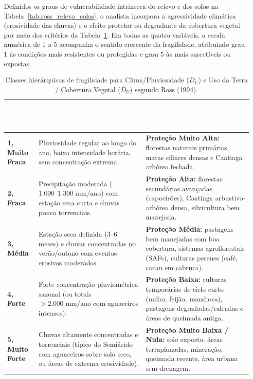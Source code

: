 Definidos os graus de vulnerabilidade intrínseca do relevo e dos solos na Tabela~\ref{tab:ross_relevo_solos}, o analista incorpora a agressividade climática (erosividade das chuvas) e o efeito protetor ou degradante da cobertura vegetal por meio dos critérios da Tabela~\ref{tab:ross_clima_uso}. Em todas as quatro variáveis, a escala numérica de $1$ a $5$ acompanha o sentido crescente da fragilidade, atribuindo grau $1$ às condições mais resistentes ou protegidas e grau $5$ às mais suscetíveis ou expostas.

\begin{table}[H]
\centering
\caption{Classes hierárquicas de fragilidade para Clima/Pluviosidade ($D_C$) e Uso da Terra / Cobertura Vegetal ($D_U$) segundo Ross (1994).}
\label{tab:ross_clima_uso}
\renewcommand{\arraystretch}{1.18}
\small
\begin{tabularx}{\textwidth}{@{}p{1.9cm} p{5.5cm} >{\raggedright\arraybackslash}X@{}}
  \toprule
  \rowcolor{uefsNavy}
  \textcolor{white}{\bfseries Classe / Grau} & \textcolor{white}{\bfseries Clima / Pluviosidade ($D_C$, Erosividade)} & \textcolor{white}{\bfseries Uso da Terra / Cobertura Vegetal ($D_U$, Grau de Proteção)} \\
  \midrule
  \textbf{1, Muito Fraca} & Pluviosidade regular ao longo do ano, baixa intensidade horária, sem concentração extrema. & \textbf{Proteção Muito Alta:} florestas naturais primárias, matas ciliares densas e Caatinga arbórea fechada. \\
  \rowcolor{bgGray}
  \textbf{2, Fraca} & Precipitação moderada ($1.000\text{--}1.300\text{ mm/ano}$) com estação seca curta e chuvas pouco torrenciais. & \textbf{Proteção Alta:} florestas secundárias avançadas (capoeirões), Caatinga arbustivo-arbórea densa, silvicultura bem manejada. \\
  \textbf{3, Média} & Estação seca definida ($3\text{--}6$ meses) e chuvas concentradas no verão/outono com eventos erosivos moderados. & \textbf{Proteção Média:} pastagens bem manejadas com boa cobertura, sistemas agroflorestais (SAFs), culturas perenes (café, cacau em cabruca). \\
  \rowcolor{bgGray}
  \textbf{4, Forte} & Forte concentração pluviométrica sazonal (ou totais $>2.000\text{ mm/ano}$ com aguaceiros intensos). & \textbf{Proteção Baixa:} culturas temporárias de ciclo curto (milho, feijão, mandioca), pastagens degradadas/raleadas e áreas de queimada antiga. \\
  \textbf{5, Muito Forte} & Chuvas altamente concentradas e torrenciais (típico do Semiárido com aguaceiros sobre solo seco, ou áreas de extrema erosividade). & \textbf{Proteção Muito Baixa / Nula:} solo exposto, áreas terraplanadas, mineração, queimada recente, área urbana sem drenagem. \\
  \bottomrule
\end{tabularx}
\end{table}

